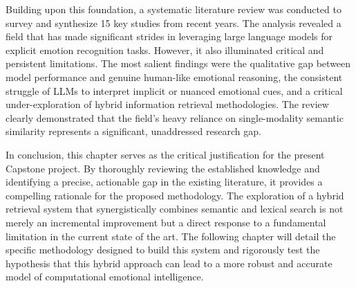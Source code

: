 Building upon this foundation, a systematic literature review was conducted to survey and synthesize 15 key studies from recent years. The analysis revealed a field that has made significant strides in leveraging large language models for explicit emotion recognition tasks. However, it also illuminated critical and persistent limitations. The most salient findings were the qualitative gap between model performance and genuine human-like emotional reasoning, the consistent struggle of LLMs to interpret implicit or nuanced emotional cues, and a critical under-exploration of hybrid information retrieval methodologies. The review clearly demonstrated that the field's heavy reliance on single-modality semantic similarity represents a significant, unaddressed research gap.

In conclusion, this chapter serves as the critical justification for the present Capstone project. By thoroughly reviewing the established knowledge and identifying a precise, actionable gap in the existing literature, it provides a compelling rationale for the proposed methodology. The exploration of a hybrid retrieval system that synergistically combines semantic and lexical search is not merely an incremental improvement but a direct response to a fundamental limitation in the current state of the art. The following chapter will detail the specific methodology designed to build this system and rigorously test the hypothesis that this hybrid approach can lead to a more robust and accurate model of computational emotional intelligence.

